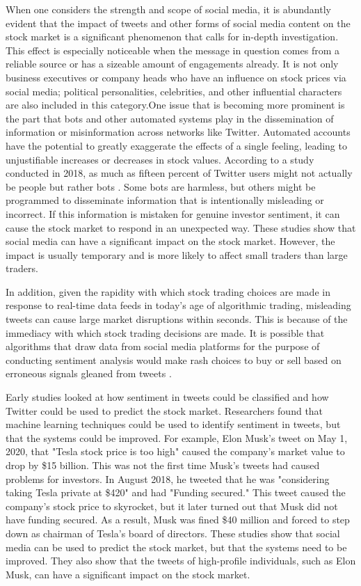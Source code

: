 \documentclass[12pt, a4paper,twoside]{report}
\theoremstyle{plain} %
\theoremstyle{definition} %
\theoremstyle{remark} %
\numberwithin{equation}{chapter}
\begin{document}
When one considers the strength and scope of social media, it is abundantly evident that the impact of tweets and other forms of social media content on the stock market is a significant phenomenon that calls for in-depth investigation. This effect is especially noticeable when the message in question comes from a reliable source or has a sizeable amount of engagements already. It is not only business executives or company heads who have an influence on stock prices via social media; political personalities, celebrities, and other influential characters are also included in this category.One issue that is becoming more prominent is the part that bots and other automated systems play in the dissemination of information or misinformation across networks like Twitter. Automated accounts have the potential to greatly exaggerate the effects of a single feeling, leading to unjustifiable increases or decreases in stock values. According to a study conducted in 2018, as much as fifteen percent of Twitter users might not actually be people but rather bots \cite{varol2017twitterbots}. Some bots are harmless, but others might be programmed to disseminate information that is intentionally misleading or incorrect. If this information is mistaken for genuine investor sentiment, it can cause the stock market to respond in an unexpected way.
These studies show that social media can have a significant impact on the stock market. However, the impact is usually temporary and is more likely to affect small traders than large traders.

In addition, given the rapidity with which stock trading choices are made in response to real-time data feeds in today's age of algorithmic trading, misleading tweets can cause large market disruptions within seconds. This is because of the immediacy with which stock trading decisions are made. It is possible that algorithms that draw data from social media platforms for the purpose of conducting sentiment analysis would make rash choices to buy or sell based on erroneous signals gleaned from tweets \cite{chakraborty2017stop}.


Early studies looked at how sentiment in tweets could be classified and how Twitter could be used to predict the stock market. Researchers found that machine learning techniques could be used to identify sentiment in tweets, but that the systems could be improved. For example, Elon Musk's tweet on May 1, 2020, that "Tesla stock price is too high" caused the company's market value to drop by \$15 billion. This was not the first time Musk's tweets had caused problems for investors. In August 2018, he tweeted that he was "considering taking Tesla private at \$420" and had "Funding secured." This tweet caused the company's stock price to skyrocket, but it later turned out that Musk did not have funding secured. As a result, Musk was fined \$40 million and forced to step down as chairman of Tesla's board of directors. These studies show that social media can be used to predict the stock market, but that the systems need to be improved. They also show that the tweets of high-profile individuals, such as Elon Musk, can have a significant impact on the stock market.
\end{document}
